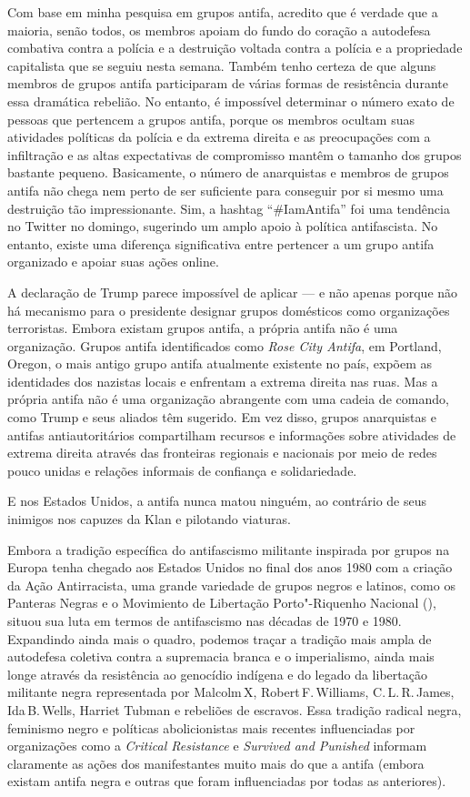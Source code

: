 Com base em minha pesquisa em grupos antifa, acredito que é verdade que a maioria, senão todos, os membros apoiam do fundo do coração a autodefesa combativa contra a polícia e a destruição voltada contra a polícia e a propriedade capitalista que se seguiu nesta semana. Também tenho certeza de que alguns membros de grupos antifa participaram de várias formas de resistência durante essa dramática rebelião. No entanto, é impossível determinar o número exato de pessoas que pertencem a grupos antifa, porque os membros ocultam suas atividades políticas da polícia e da extrema direita e as preocupações com a infiltração e as altas expectativas de compromisso mantêm o tamanho dos grupos bastante pequeno. Basicamente, o número de anarquistas e membros de grupos antifa não chega nem perto de ser suficiente para conseguir por si mesmo uma destruição tão impressionante. Sim, a hashtag ``\#IamAntifa'' foi uma tendência no Twitter no domingo, sugerindo um amplo apoio à política antifascista. No entanto, existe uma diferença significativa entre pertencer a um grupo antifa organizado e apoiar suas ações online.

A declaração de Trump parece impossível de aplicar — e não apenas porque não há mecanismo para o presidente designar grupos domésticos como organizações terroristas. Embora existam grupos antifa, a própria antifa não é uma organização. Grupos antifa identificados como \emph{Rose City Antifa}, em Portland, Oregon, o mais antigo grupo antifa atualmente existente no país, expõem as identidades dos nazistas locais e enfrentam a extrema direita nas ruas. Mas a própria antifa não é uma organização abrangente com uma cadeia de comando, como Trump e seus aliados têm sugerido. Em vez disso, grupos anarquistas e antifas antiautoritários compartilham recursos e informações sobre atividades de extrema direita através das fronteiras regionais e nacionais por meio de redes pouco unidas e relações informais de confiança e solidariedade.
 
E nos Estados Unidos, a antifa nunca matou ninguém, ao contrário de seus inimigos nos capuzes da Klan e pilotando viaturas.

Embora a tradição específica do antifascismo militante inspirada por grupos na Europa tenha chegado aos Estados Unidos no final dos anos 1980 com a criação da Ação Antirracista, uma grande variedade de grupos negros e latinos, como os Panteras Negras e o Movimiento de Libertação Porto"-Riquenho Nacional (), situou sua luta em termos de antifascismo nas décadas de 1970 e 1980. Expandindo ainda mais o quadro, podemos traçar a tradição mais ampla de autodefesa coletiva contra a supremacia branca e o imperialismo, ainda mais longe através da resistência ao genocídio indígena e do legado da libertação militante negra representada por Malcolm\,X, Robert\,F.\,Williams, C.\,L.\,R.\,James, Ida\,B.\,Wells, Harriet Tubman e rebeliões de escravos. Essa tradição radical negra, feminismo negro e políticas abolicionistas mais recentes influenciadas por organizações como a \emph{Critical Resistance} e \emph{Survived and Punished} informam claramente as ações dos manifestantes muito mais do que a antifa (embora existam antifa negra e outras que foram influenciadas por todas as anteriores).
 
